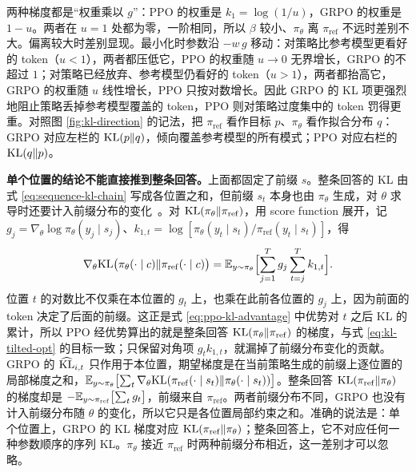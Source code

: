 两种梯度都是“权重乘以 \(g\)”：PPO 的权重是 \(k_1=\log(1/u)\)，GRPO 的权重是 \(1-u\)。两者在 \(u=1\) 处都为零，一阶相同，所以 \(\beta\) 较小、\(\pi_\theta\) 离 \(\pi_{\mathrm{ref}}\) 不远时差别不大。偏离较大时差别显现。最小化时参数沿 \(-w\,g\) 移动：对策略比参考模型更看好的 token（\(u<1\)），两者都压低它，PPO 的权重随 \(u\to0\) 无界增长，GRPO 的不超过 \(1\)；对策略已经放弃、参考模型仍看好的 token（\(u>1\)），两者都抬高它，GRPO 的权重随 \(u\) 线性增长，PPO 只按对数增长。因此 GRPO 的 KL 项更强烈地阻止策略丢掉参考模型覆盖的 token，PPO 则对策略过度集中的 token 罚得更重。对照图 \ref{fig:kl-direction} 的记法，把 \(\pi_{\mathrm{ref}}\) 看作目标 \(p\)、\(\pi_\theta\) 看作拟合分布 \(q\)：GRPO 对应左栏的 \(\mathrm{KL}(p\Vert q)\)，倾向覆盖参考模型的所有模式；PPO 对应右栏的 \(\mathrm{KL}(q\Vert p)\)。

\textbf{单个位置的结论不能直接推到整条回答。}上面都固定了前缀 \(s\)。整条回答的 KL 由式 \eqref{eq:sequence-kl-chain} 写成各位置之和，但前缀 \(s_t\) 本身也由 \(\pi_\theta\) 生成，对 \(\theta\) 求导时还要计入前缀分布的变化~\cite{tang2025klpitfalls}。对 \(\mathrm{KL}(\pi_\theta\Vert\pi_{\mathrm{ref}})\)，用 score function 展开，记 \(g_j=\nabla_\theta\log\pi_\theta(y_j\mid s_j)\)、\(k_{1,t}=\log[\pi_\theta(y_t\mid s_t)/\pi_{\mathrm{ref}}(y_t\mid s_t)]\)，得
\begin{equation}
 \nabla_\theta\mathrm{KL}\bigl(\pi_\theta(\cdot\mid c)\Vert\pi_{\mathrm{ref}}(\cdot\mid c)\bigr)
 =\mathbb{E}_{y\sim\pi_\theta}\Bigl[\sum_{j=1}^{T}g_j\sum_{t=j}^{T}k_{1,t}\Bigr].
 \label{eq:seq-kl-grad}
\end{equation}
位置 \(t\) 的对数比不仅乘在本位置的 \(g_t\) 上，也乘在此前各位置的 \(g_j\) 上，因为前面的 token 决定了后面的前缀。这正是式 \eqref{eq:ppo-kl-advantage} 中优势对 \(t\) 之后 KL 的累计，所以 PPO 经优势算出的就是整条回答 \(\mathrm{KL}(\pi_\theta\Vert\pi_{\mathrm{ref}})\) 的梯度，与式 \eqref{eq:kl-tilted-opt} 的目标一致；只保留对角项 \(g_tk_{1,t}\)，就漏掉了前缀分布变化的贡献。GRPO 的 \(\widehat{\mathrm{KL}}_{i,t}\) 只作用于本位置，期望梯度是在当前策略生成的前缀上逐位置的局部梯度之和，\(\mathbb{E}_{y\sim\pi_\theta}\bigl[\sum_t\nabla_\theta\mathrm{KL}(\pi_{\mathrm{ref}}(\cdot\mid s_t)\Vert\pi_\theta(\cdot\mid s_t))\bigr]\)。整条回答 \(\mathrm{KL}(\pi_{\mathrm{ref}}\Vert\pi_\theta)\) 的梯度却是 \(-\mathbb{E}_{y\sim\pi_{\mathrm{ref}}}\bigl[\sum_tg_t\bigr]\)，前缀来自 \(\pi_{\mathrm{ref}}\)。两者前缀分布不同，GRPO 也没有计入前缀分布随 \(\theta\) 的变化，所以它只是各位置局部约束之和。准确的说法是：单个位置上，GRPO 的 KL 梯度对应 \(\mathrm{KL}(\pi_{\mathrm{ref}}\Vert\pi_\theta)\)；整条回答上，它不对应任何一种参数顺序的序列 KL。\(\pi_\theta\) 接近 \(\pi_{\mathrm{ref}}\) 时两种前缀分布相近，这一差别才可以忽略。

